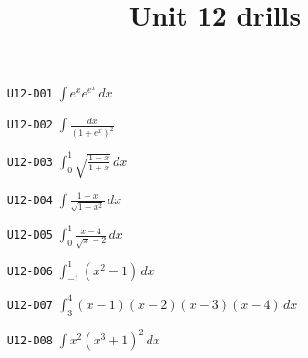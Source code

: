 
\title{Unit 12 drills}

\maketitle
\begin{enumerate}
  \item[\texttt{U12-D01}] $\displaystyle\int e^{x}e^{e^{x}}\,dx$
  \item[\texttt{U12-D02}] $\displaystyle\int \frac{dx}{(1+e^{x})^{2}}$
  \item[\texttt{U12-D03}] $\displaystyle\int_{0}^{1}\sqrt{\frac{1-x}{1+x}}\,dx$
  \item[\texttt{U12-D04}] $\displaystyle\int \frac{1-x}{\sqrt{1-x^{2}}}\,dx$
  \item[\texttt{U12-D05}] $\displaystyle\int_{0}^{1}\frac{x-4}{\sqrt{x}-2}\,dx$
  \item[\texttt{U12-D06}] $\displaystyle\int_{-1}^{1}(x^{2}-1)\,dx$
  \item[\texttt{U12-D07}] $\displaystyle\int_{3}^{4}(x-1)(x-2)(x-3)(x-4)\,dx$
  \item[\texttt{U12-D08}] $\displaystyle\int x^{2}(x^{3}+1)^{2}\,dx$
\end{enumerate}

